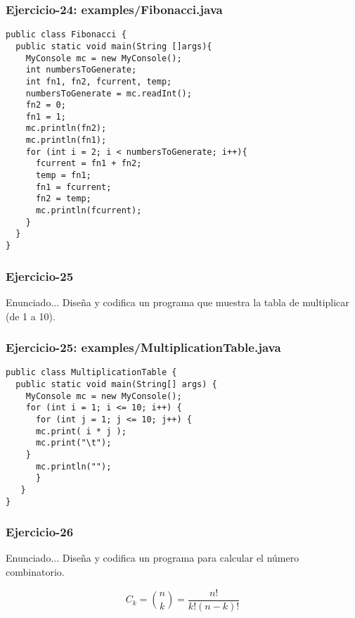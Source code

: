 \documentclass[xcolor=dvipsnames,dvip,notes=show,handout,table]{beamer}
\begin{document}
\begin{frame}[fragile]
\frametitle{Ejercicio-24: examples/Fibonacci.java}
\scriptsize
\begin{lstlisting}
public class Fibonacci {
  public static void main(String []args){
    MyConsole mc = new MyConsole();
    int numbersToGenerate;
    int fn1, fn2, fcurrent, temp;
    numbersToGenerate = mc.readInt();
    fn2 = 0;
    fn1 = 1;
    mc.println(fn2);
    mc.println(fn1);
    for (int i = 2; i < numbersToGenerate; i++){
      fcurrent = fn1 + fn2;
      temp = fn1;
      fn1 = fcurrent;
      fn2 = temp;
      mc.println(fcurrent);
    }
  }
}
\end{lstlisting}
\end{frame}

\begin{frame}[fragile]
\frametitle{Ejercicio-25}
\begin{block}{Enunciado...}
Diseña y codifica un programa que muestra la tabla de multiplicar (de 1 a 10).
\end{block}
% 
\end{frame}

\begin{frame}[fragile]
\frametitle{Ejercicio-25: examples/MultiplicationTable.java}
\scriptsize
\begin{lstlisting}
public class MultiplicationTable {
  public static void main(String[] args) {
    MyConsole mc = new MyConsole();
    for (int i = 1; i <= 10; i++) {
      for (int j = 1; j <= 10; j++) {
	  mc.print( i * j );
	  mc.print("\t");
	}
      mc.println("");
      }
   }
}
\end{lstlisting}
\end{frame}



\begin{frame}[fragile]
\frametitle{Ejercicio-26}
\begin{block}{Enunciado...}
Diseña y codifica un programa para calcular el número combinatorio.
\end{block}
% 

\begin{equation}
C_{k} = \binom{n}{k} = \frac{n!}{k!(n-k)!} 
\end{equation}

\end{frame}
\end{document}
